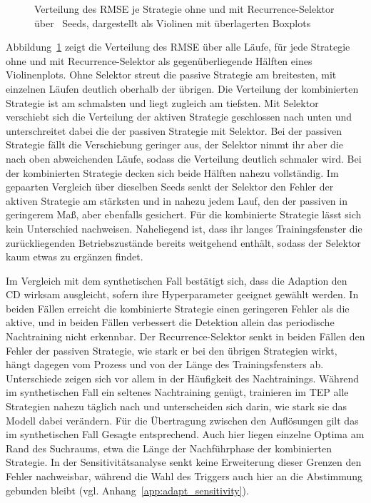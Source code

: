 %
\begin{figure}[tbp]
    \centering
    \makebox[\textwidth][c]{%
        
    }
    \caption{Verteilung des \ac{RMSE} je Strategie ohne und mit Recurrence-Selektor über \tepadaptNSeeds\ Seeds, dargestellt als Violinen mit überlagerten Boxplots}
    \label{fig:tep_adaptation_seed_violin}
\end{figure}
%
Abbildung~\ref{fig:tep_adaptation_seed_violin} zeigt die Verteilung des \ac{RMSE} über alle Läufe, für jede Strategie ohne und mit Recurrence-Selektor als gegenüberliegende Hälften eines Violinenplots. Ohne Selektor streut die passive Strategie am breitesten, mit einzelnen Läufen deutlich oberhalb der übrigen. Die Verteilung der kombinierten Strategie ist am schmalsten und liegt zugleich am tiefsten. Mit Selektor verschiebt sich die Verteilung der aktiven Strategie geschlossen nach unten und unterschreitet dabei die der passiven Strategie mit Selektor. Bei der passiven Strategie fällt die Verschiebung geringer aus, der Selektor nimmt ihr aber die nach oben abweichenden Läufe, sodass die Verteilung deutlich schmaler wird. Bei der kombinierten Strategie decken sich beide Hälften nahezu vollständig. Im gepaarten Vergleich über dieselben Seeds senkt der Selektor den Fehler der aktiven Strategie am stärksten und in nahezu jedem Lauf, den der passiven in geringerem Maß, aber ebenfalls gesichert. Für die kombinierte Strategie lässt sich kein Unterschied nachweisen. Naheliegend ist, dass ihr langes Trainingsfenster die zurückliegenden Betriebszustände bereits weitgehend enthält, sodass der Selektor kaum etwas zu ergänzen findet. \par
%
Im Vergleich mit dem synthetischen Fall bestätigt sich, dass die Adaption den \ac{CD} wirksam ausgleicht, sofern ihre Hyperparameter geeignet gewählt werden. In beiden Fällen erreicht die kombinierte Strategie einen geringeren Fehler als die aktive, und in beiden Fällen verbessert die Detektion allein das periodische Nachtraining nicht erkennbar. Der Recurrence-Selektor senkt in beiden Fällen den Fehler der passiven Strategie, wie stark er bei den übrigen Strategien wirkt, hängt dagegen vom Prozess und von der Länge des Trainingsfensters ab. Unterschiede zeigen sich vor allem in der Häufigkeit des Nachtrainings. Während im synthetischen Fall ein seltenes Nachtraining genügt, trainieren im \ac{TEP} alle Strategien nahezu täglich nach und unterscheiden sich darin, wie stark sie das Modell dabei verändern. Für die Übertragung zwischen den Auflösungen gilt das im synthetischen Fall Gesagte entsprechend. Auch hier liegen einzelne Optima am Rand des Suchraums, etwa die Länge der Nachführphase der kombinierten Strategie. In der Sensitivitätsanalyse senkt keine Erweiterung dieser Grenzen den Fehler nachweisbar, während die Wahl des Triggers auch hier an die Abstimmung gebunden bleibt (vgl. Anhang~\ref{app:adapt_sensitivity}).
%